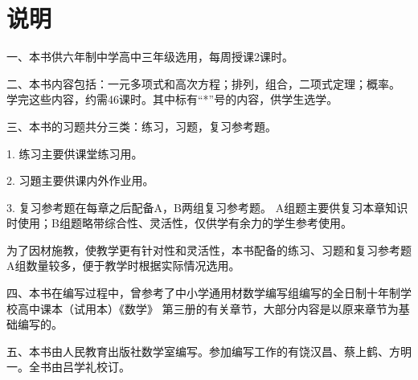 
\chapter{说明}

一、本书供六年制中学高中三年级选用，每周授课2课时。

二、本书内容包括：一元多项式和高次方程；排列，组合，二项式定理；概率。
学完这些内容，约需46课时。其中标有“*”号的内容，供学生选学。

三、本书的习题共分三类：练习，习题，复习参考題。

1. 练习\quad 主要供课堂练习用。

2. 习題\quad 主要供课内外作业用。

3. 复习参考题\quad 在每章之后配备A，B两组复习参考题。
A组题主要供复习本章知识时使用；B组题略带综合性、灵活性，仅供学有余力的学生参考使用。

为了因材施教，使教学更有针对性和灵活性，本书配备的练习、习题和复习参考题A组数量较多，便于教学时根据实际情况选用。

四、本书在编写过程中，曾参考了中小学通用材数学编写组编写的全日制十年制学校高中课本（试用本）《数学》
第三册的有关章节，大部分内容是以原来章节为基础编写的。

五、本书由人民教育出版社数学室编写。参加编写工作的有饶汉昌、蔡上鹤、方明一。全书由吕学礼校订。
